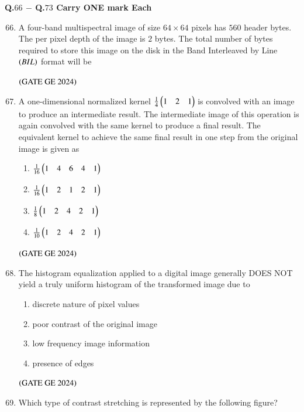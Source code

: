 \documentclass[journal,12pt,onecolumn]{IEEEtran}
\theoremstyle{remark}
\begin{document}
\textbf{Q.$66$ $-$ Q.$73$ Carry ONE mark Each}
\bigskip
\begin{enumerate}
\setcounter{enumi}{65}
\item A four-band multispectral image of size $64 \times 64$ pixels has $560$ header bytes.
The per pixel depth of the image is $2$ bytes.
The total number of bytes required to store this image on the disk in the Band Interleaved by Line $\brak{BIL}$ format will be
\begin{enumerate}
\end{enumerate}
\hfill $\brak{\text{GATE GE 2024}}$
\bigskip
\item A one-dimensional normalized kernel $\frac{1}{4}\myvec{1 & 2 & 1}$ is convolved with an image to produce an intermediate result.
The intermediate image of this operation is again convolved with the same kernel to produce a final result.
The equivalent kernel to achieve the same final result in one step from the original image is given as
\begin{enumerate}
\item $\frac{1}{16}\myvec{1 & 4 & 6 & 4 & 1}$
\item $\frac{1}{16}\myvec{1 & 2 & 1 & 2 & 1}$
\item $\frac{1}{8}\myvec{1 & 2 & 4 & 2 & 1}$
\item $\frac{1}{10}\myvec{1 & 2 & 4 & 2 & 1}$
\end{enumerate}
\hfill $\brak{\text{GATE GE 2024}}$
\bigskip
\item The histogram equalization applied to a digital image generally DOES NOT yield a truly uniform histogram of the transformed image due to
\begin{enumerate}
\item discrete nature of pixel values
\item poor contrast of the original image
\item low frequency image information
\item 
presence of edges
\end{enumerate}
\hfill $\brak{\text{GATE GE 2024}}$
\bigskip
\item Which type of contrast stretching is represented by the following figure?\\

\end{enumerate}
\end{document}
